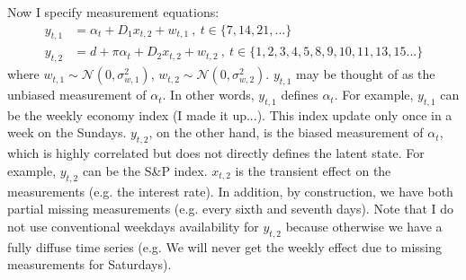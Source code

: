 \documentclass[10pt, titlepage]{article}
\numberwithin{equation}{section}
\begin{document}
Now I specify measurement equations: 
\begin{align}
    y_{t,1} &= \alpha_t+D_1x_{t,2}+w_{t,1} \ , \ t\in\{7,14,21,...\} \\
    y_{t,2} &= d + \pi\alpha_t+D_2x_{t,2}+w_{t,2}\ , \ t\in\{1,2,3,4,5,8,9,10,11,13,15...\} \label{eq:y2}
\end{align}
where $w_{t,1}\sim\mathcal{N}(0,\sigma_{w,1}^2)$, $w_{t,2}\sim\mathcal{N}(0,\sigma_{w,2}^2)$. $y_{t,1}$ may be thought of as the unbiased measurement of $\alpha_t$. In other words, $y_{t,1}$ defines $\alpha_t$. For example, $y_{t,1}$ can be the weekly economy index (I made it up...). This index update only once in a week on the Sundays. $y_{t,2}$, on the other hand, is the biased measurement of $\alpha_t$, which is highly correlated but does not directly defines the latent state. For example, $y_{t,2}$ can be the S\&P index. $x_{t,2}$ is the transient effect on the measurements (e.g. the interest rate). In addition, by construction, we have both partial missing measurements (e.g. every sixth and seventh days). Note that I do not use conventional weekdays availability for $y_{t,2}$ because otherwise we have a fully diffuse time series (e.g. We will never get the weekly effect due to missing measurements for Saturdays).
\end{document}
